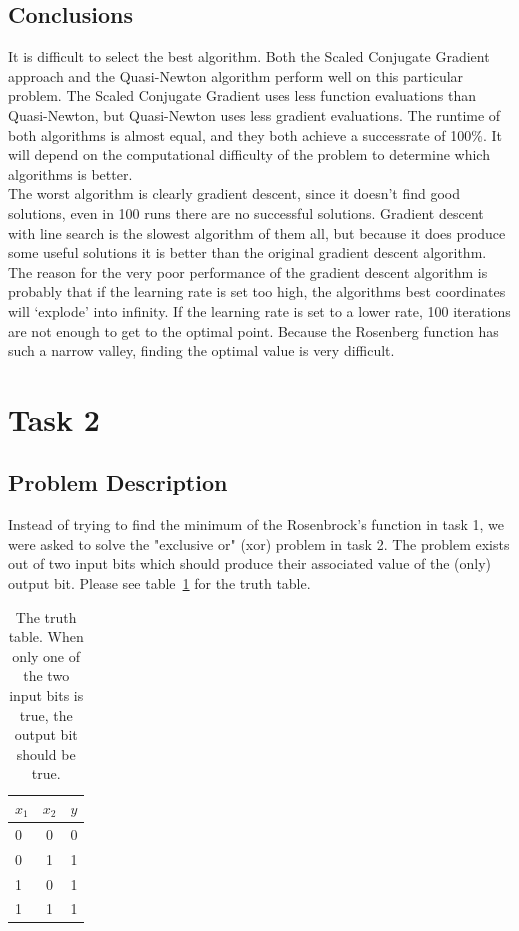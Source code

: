 \documentclass{article}
\begin{document}
\subsection{Conclusions}
It is difficult to select the best algorithm. Both the Scaled Conjugate Gradient approach and the Quasi-Newton algorithm perform well on this particular problem. The Scaled Conjugate Gradient uses less function evaluations than Quasi-Newton, but Quasi-Newton uses less gradient evaluations. The runtime of both algorithms is almost equal, and they both achieve a successrate of 100\%. It will depend on the computational difficulty of the problem to determine which algorithms is better. \\
The worst algorithm is clearly gradient descent, since it doesn't find good solutions, even in 100 runs there are no successful solutions. Gradient descent with line search is the slowest algorithm of them all, but because it does produce some useful solutions it is better than the original gradient descent algorithm.
The reason for the very poor performance of the gradient descent algorithm is probably that if the learning rate is set too high, the algorithms best coordinates will `explode' into infinity. If the learning rate is set to a lower rate, 100 iterations are not enough to get to the optimal point. Because the Rosenberg function has such a narrow valley, finding the optimal value is very difficult.

\newpage
\section{Task 2}
\subsection{Problem Description}
Instead of trying to find the minimum of the Rosenbrock's function in task 1, we were asked to solve the "exclusive or" (xor) problem in task 2. The problem exists out of two input bits which should produce their associated value of the (only) output bit. Please see table~\ref{tab:tt} for the truth table.

\begin{table}[H]
	\centering
	\begin{tabular}{| l | c | r |}
		\hline
		$x_1$ & $x_2$ & $y$ \\ \hline
		0 & 0 & 0 \\ \hline
		0 & 1 & 1 \\ \hline
		1 & 0 & 1 \\ \hline
		1 & 1 & 1 \\ \hline
	\end{tabular}
	\caption{The truth table. When only one of the two input bits is true, the output bit should be true.}
	\label{tab:tt}
\end{table}
\end{document}

